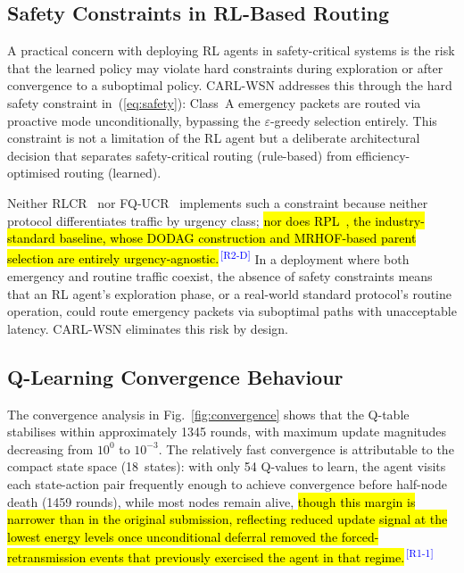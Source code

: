 \documentclass[12pt]{article}
\newcommand{\rtag}[1]{\textsuperscript{\textcolor{blue}{\scriptsize\,[#1]}}}
\newcommand{\hlx}[1]{{\exhyphenpenalty=10000\hyphenpenalty=10000\let\ \nobreakspace\hl{#1}}}
\begin{document}
\subsection{Safety Constraints in RL-Based Routing}

A practical concern with deploying RL agents in safety-critical
systems is the risk that the learned policy may violate hard
constraints during exploration or after convergence to a suboptimal
policy. CARL-WSN addresses this through the hard safety constraint
in~(\ref{eq:safety}): Class~A emergency packets are routed via
proactive mode unconditionally, bypassing the $\varepsilon$-greedy
selection entirely. This constraint is not a limitation of the RL
agent but a deliberate architectural decision that separates
safety-critical routing (rule-based) from efficiency-optimised
routing (learned).

Neither RLCR~\cite{daanoune_intelligent_2026} nor
FQ-UCR~\cite{wang_fqucr_2025} implements such a constraint because
neither protocol differentiates traffic by urgency class; \hlx{nor does
RPL~}\cite{winter2012}\hlx{, the industry-standard baseline, whose DODAG
construction and MRHOF-based parent selection are entirely
urgency-agnostic.}\rtag{R2-D} In a deployment where both emergency and routine
traffic coexist, the absence of safety constraints means that an RL
agent's exploration phase, or a real-world standard protocol's
routine operation, could route emergency packets via suboptimal
paths with unacceptable latency. CARL-WSN eliminates this risk by
design.

\subsection{Q-Learning Convergence Behaviour}

The convergence analysis in Fig.~\ref{fig:convergence} shows that
the Q-table stabilises within approximately 1345 rounds, with
maximum update magnitudes decreasing from $10^0$ to $10^{-3}$. The
relatively fast convergence is attributable to the compact state
space (18~states): with only 54 Q-values to learn, the agent
visits each state-action pair frequently enough to achieve
convergence before half-node death (1459 rounds), while most nodes
remain alive, \hlx{though this margin is narrower than in the original
submission, reflecting reduced update signal at the lowest energy
levels once unconditional deferral removed the forced-retransmission
events that previously exercised the agent in that regime.}\rtag{R1-1}
\end{document}
